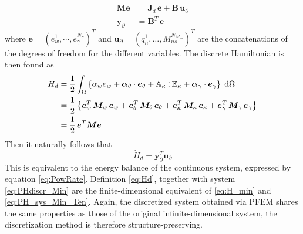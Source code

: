 \documentclass[preprint,12pt]{elsarticle}
\def\onedot{$\mathsurround0pt\ldotp$}
\def\cddot{%
	\mathbin{\vcenter{\baselineskip.67ex
			\hbox{\onedot}\hbox{\onedot}}%
}}
\begin{document}
{\begin{equation}
\label{eq:PHdiscr_Min}
\begin{aligned}
\bm{M} \dot{\bm{e}} &= \bm{J}_d  \,\bm{e} + \bm{B} \, \bm{u}_{\partial} \\
\bm{y}_{\partial} &= \bm{B}^T \, \bm{e}
\end{aligned} 
\end{equation}
where $\bm{e} = \left(e_w^1, \cdots, e_{\gamma}^{N_{\gamma}}\right)^T$ and $\bm{u}_{\partial} = \left(q_n^1, \dots, M_{ns}^{N_{M_{ns}}}\right)^T$ are the concatenations of the degrees of freedom for the different variables. The discrete Hamiltonian is then found as
\begin{equation}
\label{eq:Hd}
\begin{aligned}
H_d &= \frac{1}{2} \int_{\Omega} \left\{ \alpha_w e_w + \bm{\alpha}_\theta \cdot \bm{e}_{\theta} + \mathbb{A}_{\kappa} \cddot \mathbb{E}_\kappa + \bm\alpha_{\gamma} \cdot \bm{e}_{\gamma}  \right\} \d\Omega \\
 &=  \frac{1}{2}  \left\{ \bm{e}_w^T \, \bm{M}_w \, \bm{e}_w + \bm{e}_\theta^T \, \bm{M}_\theta \, \bm{e}_\theta + \bm{e}_\kappa^T \, \bm{M}_\kappa \, \bm{e}_\kappa + \bm{e}_{\gamma}^T \, \bm{M}_{\gamma} \, \bm{e}_{\gamma}  \right\} \\
 &=  \frac{1}{2} \, \bm{e}^T  \bm{M}  \bm{e}
\end{aligned}
\end{equation}
}
Then it naturally follows that
\begin{equation}
\dot{H}_d = \bm{y}_{\partial}^T \bm{u}_{\partial}
\end{equation}
This is equivalent to the energy balance of the continuous system, expressed by equation \eqref{eq:PowRate}. Definition \eqref{eq:Hd}, together with system \eqref{eq:PHdiscr_Min} are the finite-dimensional equivalent of \eqref{eq:H_min} and  \eqref{eq:PH_sys_Min_Ten}. Again, the discretized system obtained via PFEM shares the same properties as those of the original infinite-dimensional system, the discretization method is therefore structure-preserving. \\
\end{document}

